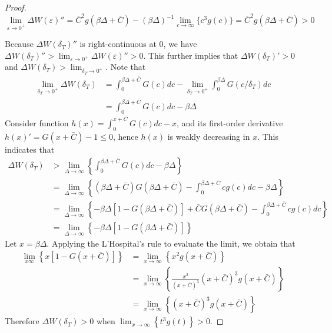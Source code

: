 \documentclass[11pt]{article}
\begin{document}
\begin{proof}
$$\lim_{\varepsilon \rightarrow 0^{+}}\Delta W (\varepsilon)''=\bar{C}^2g(\beta \Delta+\bar{C})-(\beta \Delta)^{-1}\lim_{c\rightarrow \infty}\{c^3g(c)\}=\bar{C}^2g(\beta \Delta+\bar{C})>0$$

Because $\Delta W(\delta_T)''$ is right-continuous at $0$, we have $\Delta W(\delta_T)''> \lim_{\varepsilon \rightarrow 0^{+}}\Delta W(\varepsilon)''>0$. This further implies that $\Delta W(\delta_T)'>0$ and $\Delta W(\delta_T)>\lim_{\delta_T\rightarrow 0^+}$. Note that
\begin{align*}
    \lim_{\delta_T\rightarrow 0^{+}} \Delta W(\delta_T)
        & = \int_0^{\beta \Delta+\bar{C}} G(c)dc - \lim_{\delta_T\rightarrow 0^{+}}\int_0^{\beta \Delta}G(c/\delta_T)dc \\
        & = \int_0^{\beta \Delta+\bar{C}} G(c)dc - \beta \Delta 
\end{align*}
Consider function $h(x) = \int_0^{x+\bar{C}}G(c)dc-x$, and its first-order derivative $h(x)'=G(x+\bar{C})-1\leq 0$, hence $h(x)$ is weakly decreasing in $x$. This indicates that
\begin{align*}
    \Delta W(\delta_T)
        &> \lim_{\Delta \rightarrow \infty}\left\{\int_0^{\beta \Delta+\bar{C}} G(c)dc - \beta \Delta \right\} \\
        &= \lim_{\Delta\rightarrow \infty} \left\{(\beta\Delta + \bar{C})G(\beta\Delta +\bar{C})-\int_0^{\beta \Delta +\bar{C}}cg(c)dc-\beta\Delta \right\} \\
        &= \lim_{\Delta\rightarrow \infty}\left\{-\beta\Delta \left[1-G(\beta \Delta+\bar{C})\right]+\bar{C}G(\beta\Delta +\bar{C})-\int_0^{\beta \Delta +\bar{C}}cg(c)dc\right\} \\
        &= \lim_{\Delta\rightarrow \infty}\left\{-\beta\Delta \left[1-G(\beta \Delta+\bar{C})\right]\right\}    
\end{align*}
Let $x = \beta\Delta$. Applying the L'Hospital's rule to evaluate the limit, we obtain that 
\begin{align*}
    \lim_{x \infty}\left\{x \left[1-G(x+\bar{C})\right]\right\}&= \lim _{x\rightarrow \infty} \left\{x^2g(x+\bar{C})\right\} \\
            &= \lim_{x\rightarrow\infty}\left\{\frac{x^2}{(x+\bar{C})^3}(x+\bar{C})^3 g(x+\bar{C})\right\} \\
            & = \lim_{x\rightarrow\infty}\left\{(x+\bar{C})^3 g(x+\bar{C})\right\}
\end{align*}
Therefore $\Delta W(\delta_T)>0$ when $\lim_{x\rightarrow\infty}\left\{t^3 g(t)\right\}>0$. 

\end{proof} 
\end{document}
